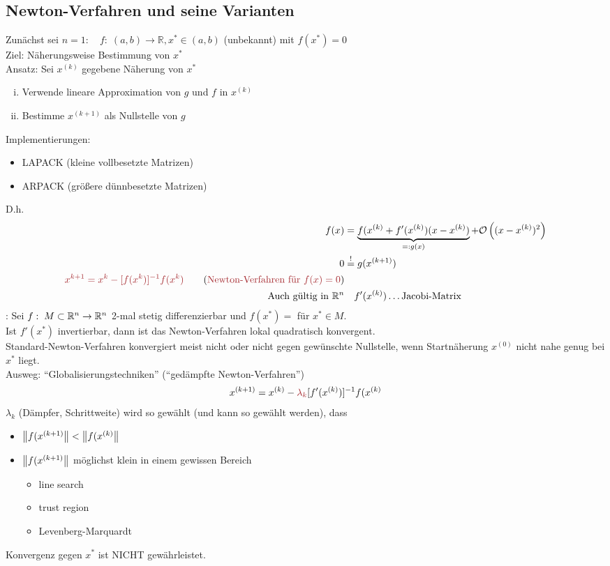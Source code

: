 \subsection{Newton-Verfahren und seine Varianten}
Zunächst sei $n=1: \quad f:\;(a,b) \rightarrow \mathbb{R}, x^* \in (a,b)$ (unbekannt) mit $f(x^*) = 0$\\
Ziel: Näherungsweise Bestimmung von $x^*$\\
Ansatz: Sei $x^{(k)}$ gegebene Näherung von $x^*$
\begin{enumerate}[i)]
  \item Verwende lineare Approximation von $g$ und $f$ in $x^{(k)}$
  \item Bestimme $x^{(k+1)}$ als Nullstelle von $g$
\end{enumerate}
Implementierungen:
\begin{itemize}
  \item LAPACK (kleine vollbesetzte Matrizen)
  \item ARPACK (größere dünnbesetzte Matrizen)
\end{itemize}
D.h.
\begin{align*}
  f(x) &= \underbrace{f(x^{(k)} + f'(x^{(k)})(x - x^{(k)})}_{=: g(x)} + \LandauO\left( (x - x^{(k)})^2 \right)\\
  0 &\mustbe g(x^{(k+1)})\\
  \mathbin{\textcolor{rot}{x^{k+1} = x^k - [f(x^k)]^{-1} f(x^k) }}\tag{\textcolor{rot}{Newton-Verfahren für $f(x)=0$}}\\
  \text{Auch gültig in } \rn &\quad f'(x^{(k)})\ldots\text{Jacobi-Matrix}
\end{align*}
\satz: Sei $f:\;M \subset \mathbb{R}^{n} \rightarrow \mathbb{R}^{n}$ 2-mal stetig differenzierbar und $f(x^*) = $ für $x^* \in M$.\\
Ist $f'(x^*)$ invertierbar, dann ist das Newton-Verfahren lokal quadratisch konvergent.\\
Standard-Newton-Verfahren konvergiert meist nicht oder nicht gegen gewünschte Nullstelle,
wenn Startnäherung $x^{(0)}$ nicht nahe genug bei $x^*$ liegt.\\
Ausweg: ``Globalisierungstechniken'' (``gedämpfte Newton-Verfahren'')
\begin{align*}
  x^{(k+1)} = x^{(k)} - \textcolor{rot}{\lambda_k}[f'(x^{(k)})]^{-1} f(x^{(k)}
\end{align*}
$\lambda_k$ (Dämpfer, Schrittweite) wird so gewählt (und kann so gewählt werden), dass
\begin{itemize}
  \item $\left\lVert f(x^{(k+1)} \right\rVert < \left\lVert f(x^{(k)} \right\rVert$
  \item $\left\lVert f(x^{(k+1)} \right\rVert$ möglichst klein in einem gewissen Bereich
    \begin{itemize}
      \item line search
      \item trust region %
      \item Levenberg-Marquardt
    \end{itemize}
\end{itemize}
Konvergenz gegen $x^*$ ist NICHT gewährleistet.\\

